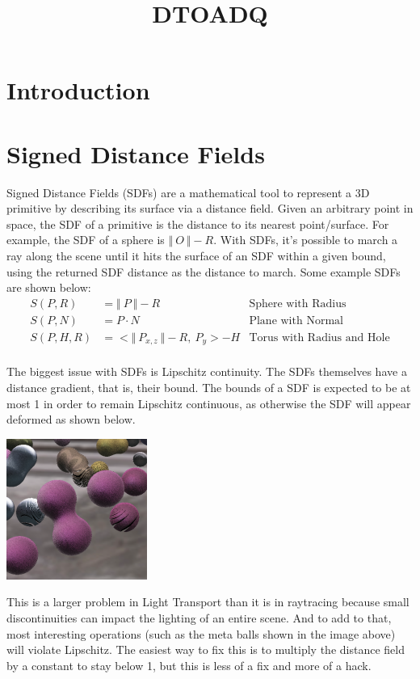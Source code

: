 \message{ !name(test.tex)}\documentclass{article}
\title{DTOADQ}
\begin{document}

  \maketitle
  \section{Introduction}

  \section{Signed Distance Fields}
  Signed Distance Fields (SDFs) are a mathematical tool to represent a 3D primitive by describing its surface via a distance field. Given an arbitrary point in space, the SDF of a primitive is the distance to its nearest point/surface. For example, the SDF of a sphere is $\Vert\:O\:\Vert - R$. With SDFs, it's possible to march a ray along the scene until it hits the surface of an SDF within a given bound, using the returned SDF distance as the distance to march. Some example SDFs are shown below:    \begin{align*}
  S(P, R) &= \Vert\:P\:\Vert - R & \text{Sphere with Radius}\\
  S(P, N) &= P \cdot N  & \text{Plane with Normal}\\
  S(P, H, R) &= <\Vert\:P_{x, z}\:\Vert - R, \: P_{y}> - H & \text{Torus with Radius and Hole}\\
  \end{align*}
  
  The biggest issue with SDFs is Lipschitz continuity. The SDFs themselves have a distance gradient, that is, their bound. The bounds of a SDF is expected to be at most 1 in order to remain Lipschitz continuous, as otherwise the SDF will appear deformed as shown below.
  
  \includegraphics[]{lipschittzbound}
  
  This is a larger problem in Light Transport than it is in raytracing because small discontinuities can impact the lighting of an entire scene. And to add to that, most interesting operations (such as the meta balls shown in the image above) will violate Lipschitz. The easiest way to fix this is to multiply the distance field by a constant to stay below 1, but this is less of a fix and more of a hack.
  
\end{document}
